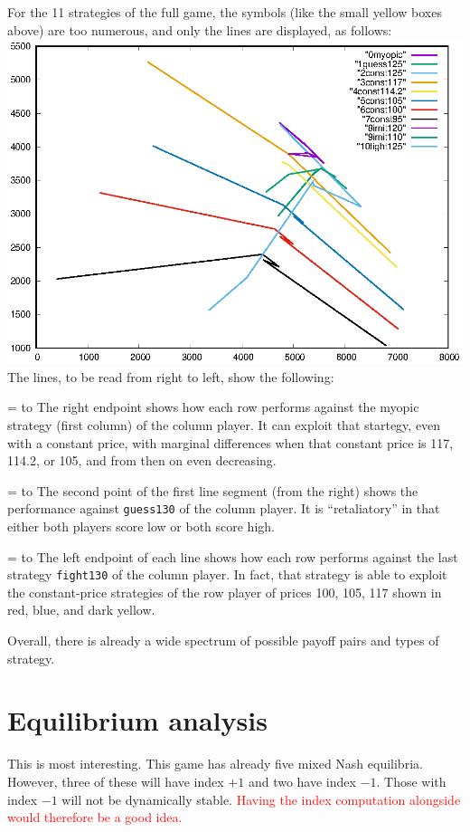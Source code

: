 \documentclass[a4paper,12pt]{article}  %
\def\R{\textcolor{red}}
\def\rmitem#1{\par\hangafter=1\hangindent=\einr
  \noindent\hbox to\einr{\ignorespaces#1\hfill}\ignorespaces}
\newcommand\bullitem{\rmitem{\raise.17ex\hbox{\kern7pt\scriptsize$\bullet$}}}
\theoremstyle{definition}
\begin{document}
For the 11 strategies of the full game, the symbols (like
the small yellow boxes above) are too
numerous, and only the lines are displayed, as follows:
\\
\includegraphics[width=15cm]{Pareto.eps}
\\
The lines, to be read from right to left, show the
following:
\bullitem
The right endpoint shows how each row performs against the
myopic strategy (first column) of the column player.
It can exploit that startegy, even with a constant price,
with marginal differences when that constant price is 
117, 114.2, or 105, and from then on even decreasing.
\bullitem
The second point of the first line segment (from the right)
shows the performance against {\tt guess130} of the column
player. It is ``retaliatory'' in that either both players
score low or both score high.
\bullitem
The left endpoint of each line shows how each row performs
against the last strategy {\tt fight130} of the column
player.
In fact, that strategy is able to exploit the constant-price
strategies of the row player of prices 100, 105, 117 shown
in red, blue, and dark yellow. 

Overall, there is already a wide spectrum of possible payoff
pairs and types of strategy.

\section{Equilibrium analysis}

This is most interesting. 
This game has already five mixed Nash equilibria.
However, three of these will have index $+1$ and two have
index $-1$.
Those with index $-1$ will not be dynamically stable.
\R{Having the index computation alongside would therefore be
a good idea.}
\end{document}
